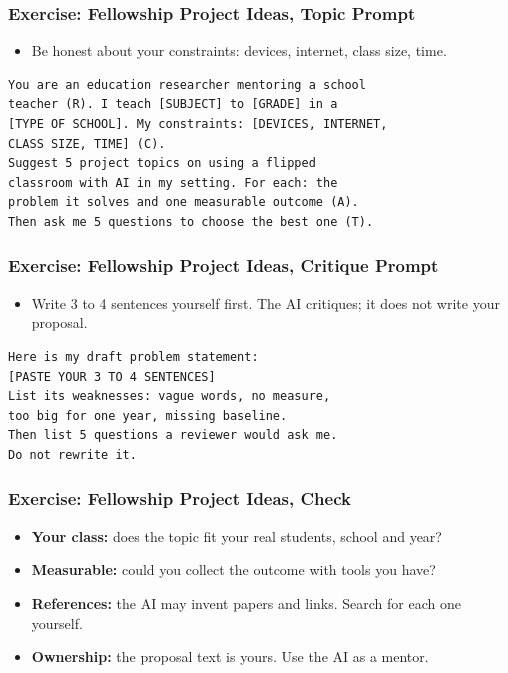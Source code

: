 \begin{frame}[fragile]\frametitle{Exercise: Fellowship Project Ideas, Topic Prompt}
\begin{itemize}
\item Be honest about your constraints: devices, internet, class size, time.
\end{itemize}
\begin{lstlisting}[language={}]
You are an education researcher mentoring a school
teacher (R). I teach [SUBJECT] to [GRADE] in a
[TYPE OF SCHOOL]. My constraints: [DEVICES, INTERNET,
CLASS SIZE, TIME] (C).
Suggest 5 project topics on using a flipped
classroom with AI in my setting. For each: the
problem it solves and one measurable outcome (A).
Then ask me 5 questions to choose the best one (T).
\end{lstlisting}
\end{frame}

\begin{frame}[fragile]\frametitle{Exercise: Fellowship Project Ideas, Critique Prompt}
\begin{itemize}
\item Write 3 to 4 sentences yourself first. The AI critiques; it does not write your proposal.
\end{itemize}
\begin{lstlisting}[language={}]
Here is my draft problem statement:
[PASTE YOUR 3 TO 4 SENTENCES]
List its weaknesses: vague words, no measure,
too big for one year, missing baseline.
Then list 5 questions a reviewer would ask me.
Do not rewrite it.
\end{lstlisting}
\end{frame}

\begin{frame}[fragile]\frametitle{Exercise: Fellowship Project Ideas, Check}
\begin{itemize}
\item \textbf{Your class:} does the topic fit your real students, school and year?
\item \textbf{Measurable:} could you collect the outcome with tools you have?
\item \textbf{References:} the AI may invent papers and links. Search for each one yourself.
\item \textbf{Ownership:} the proposal text is yours. Use the AI as a mentor.
\end{itemize}
\end{frame}
